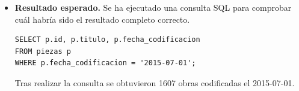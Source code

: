 \begin{itemize}
*   **Ceann Dubh Dileas** (Compás: 6/8, Tonalidad: D minor)
*   **The Steam Packet** (Compás: 2/4, Tonalidad: E minor)
*   **The Bantry Jig** (Compás: 6/8, Tonalidad: D major)
*   **The Sandy Banks of Rush** (Compás: 4/4, Tonalidad: A major)
*   **Lough Erne’s Water** (Compás: 2/2, Tonalidad: D major)
*   **The Humours of Redgap** (Compás: 4/4, Tonalidad: E minor)
*   **When Mary was a Young Thing** (Compás: 4/4, Tonalidad: E minor)
*   **A Highland Reel** (Compás: 4/4, Tonalidad: D major)
*   **The Gipsy** (Compás: 4/4, Tonalidad: G major)
*   **The Basket of Oysters** (Compás: 6/8, Tonalidad: B minor)"
\item \textbf{Resultado esperado.} Se ha ejecutado una consulta SQL para comprobar cuál habría sido el resultado completo correcto.
    \begin{verbatim}
SELECT p.id, p.titulo, p.fecha_codificacion
FROM piezas p
WHERE p.fecha_codificacion = '2015-07-01';
    \end{verbatim}    
    Tras realizar la consulta se obtuvieron 1607 obras codificadas el 2015-07-01.
    
\end{itemize}

